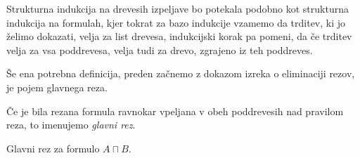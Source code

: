 \begin{definicija}
    Strukturna indukcija na drevesih izpeljave bo potekala podobno kot strukturna indukcija na formulah, kjer tokrat za bazo indukcije vzamemo da trditev, ki jo želimo dokazati, velja za list drevesa, indukcijski korak pa pomeni, da če trditev velja za vsa poddrevesa, velja tudi za drevo, zgrajeno iz teh poddreves.
\end{definicija}

Še ena potrebna definicija, preden začnemo z dokazom izreka o eliminaciji rezov, je pojem glavnega reza.

\begin{definicija} \label{gl rez}
    Če je bila rezana formula ravnokar vpeljana v obeh poddrevesih nad pravilom reza, to imenujemo \emph{glavni rez}.
\end{definicija}

\begin{primer} \label{gl rez in}
    Glavni rez za formulo $A \sqcap B$.
    \begin{prooftree}


    \end{prooftree}
\end{primer}
